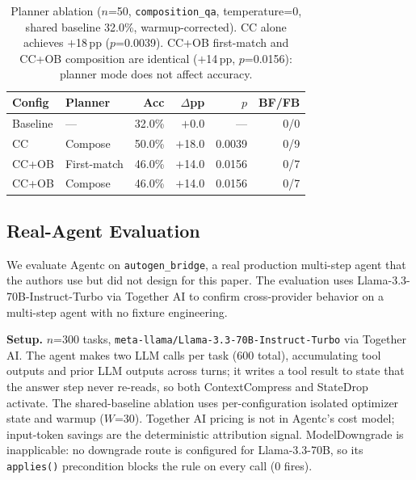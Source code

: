 \documentclass[sigconf,9pt]{acmart}
\begin{document}
\begin{table}[t]
\caption{Planner ablation ($n$=50, \texttt{composition\_qa}, temperature=0, shared
baseline 32.0\%, warmup-corrected). CC alone achieves $+$18\,pp ($p$=0.0039).
CC+OB first-match and CC+OB composition are identical ($+$14\,pp, $p$=0.0156):
planner mode does not affect accuracy.}
\label{tab:planner-ablation}
\small
\begin{tabular}{llrrrr}
\toprule
Config & Planner & Acc & $\Delta$pp & $p$ & BF/FB \\
\midrule
Baseline & ---         & 32.0\% & $+$0.0  & ---    & 0/0 \\
CC       & Compose     & 50.0\% & $+$18.0 & 0.0039 & 0/9 \\
CC+OB    & First-match & 46.0\% & $+$14.0 & 0.0156 & 0/7 \\
CC+OB    & Compose     & 46.0\% & $+$14.0 & 0.0156 & 0/7 \\
\bottomrule
\end{tabular}
\end{table}

\subsection{Real-Agent Evaluation}
\label{sec:eval-realagent}

We evaluate Agentc on \texttt{autogen\_bridge}, a real production multi-step agent
that the authors use but did not design for this paper. The evaluation uses
Llama-3.3-70B-Instruct-Turbo via Together AI to confirm cross-provider behavior on
a multi-step agent with no fixture engineering.

\textbf{Setup.} $n$=300 tasks, \texttt{meta-llama/Llama-3.3-70B-Instruct-Turbo} via
Together AI. The agent makes two LLM calls per task (600 total), accumulating tool
outputs and prior LLM outputs across turns; it writes a tool result to state that the
answer step never re-reads, so both ContextCompress and StateDrop activate. The
shared-baseline ablation uses per-configuration isolated optimizer state and warmup
($W$=30). Together AI pricing is not in Agentc's cost model; input-token savings are
the deterministic attribution signal. ModelDowngrade is inapplicable: no downgrade
route is configured for Llama-3.3-70B, so its \texttt{applies()} precondition blocks
the rule on every call (0 fires).
\end{document}
